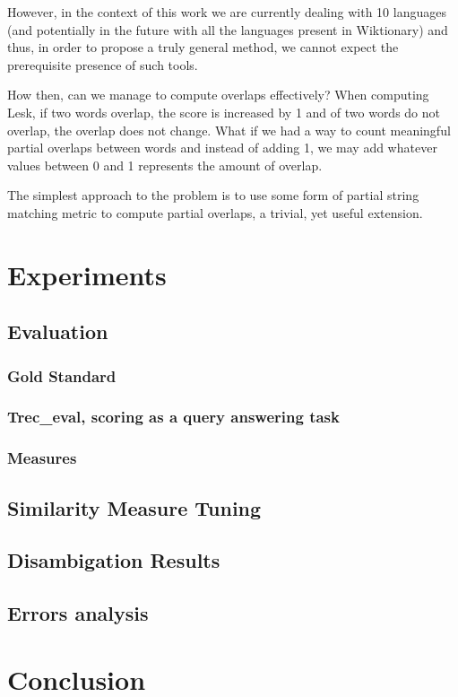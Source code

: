 \documentclass[10pt, a4paper]{article}
\begin{document}
However, in the context of this work we are currently dealing with 10 languages (and potentially in the future with all the languages present in Wiktionary) and thus, in order to propose a truly general method, we cannot expect the prerequisite presence of such tools. 

How then, can we manage to compute overlaps effectively? When computing Lesk, if two words overlap, the score is increased by 1 and of two words do not overlap, the overlap does not change. What if we had a way to count meaningful partial overlaps between words and instead of adding 1, we may add whatever values between 0 and 1 represents the amount of overlap.

The simplest approach to the problem is to use some form of partial string matching metric to compute partial overlaps, a trivial, yet useful extension. 

\section{Experiments}
\subsection{Evaluation}
\subsubsection{Gold Standard}
\subsubsection{Trec\_eval, scoring as a query answering task}
\subsubsection{Measures}
\subsection{Similarity Measure Tuning}
\subsection{Disambigation Results}
\subsection{Errors analysis}

\section{Conclusion}
\end{document}
